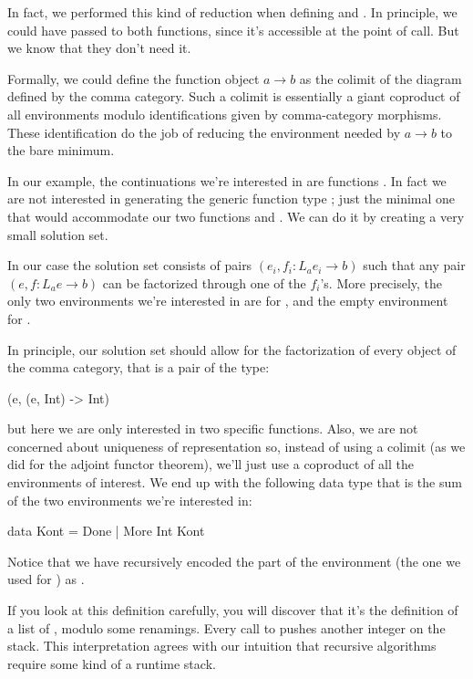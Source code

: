\documentclass[DaoFP]{subfiles}
\begin{document}
In fact, we performed this kind of reduction when defining  and . In principle, we could have passed  to both functions, since it's accessible at the point of call. But we know that they don't need it.

Formally, we could define the function object $a \to b$ as the colimit of the diagram defined by the comma category. Such a colimit is essentially a giant coproduct of all environments modulo identifications given by comma-category morphisms. These identification do the job of reducing the environment needed by $a \to b$ to the bare minimum. 

In our example, the continuations we're interested in are functions . In fact we are not interested in generating the generic function type ; just the minimal one that would accommodate our two functions  and . We can do it by creating a very small solution set. 

In our case the solution set consists of pairs $(e_i, f_i \colon L_a e_i \to b)$ such that any pair $(e, f \colon L_a e \to b)$ can be factorized through one of the $f_i$'s. More precisely, the only two environments we're interested in are  for , and the empty environment \hask{()} for . 

In principle, our solution set should allow for the factorization of every object of the comma category, that is a pair of the type:
\begin{haskell}
(e, (e, Int) -> Int)
\end{haskell}
but here we are only interested in two specific functions. Also, we are not concerned about uniqueness of representation so, instead of using a colimit (as we did for the adjoint functor theorem), we'll just use a coproduct of all the environments of interest. We end up with the following data type that is the sum of the two environments we're interested in:
\begin{haskell}
data Kont = Done | More Int Kont
\end{haskell}
Notice that we have recursively encoded the  part of the environment (the one we used for ) as . 

If you look at this definition carefully, you will discover that it's the definition of a list of , modulo some renamings. Every call to  pushes another integer on the  stack. This interpretation agrees with our intuition that recursive algorithms require some kind of a runtime stack. 
\end{document}
